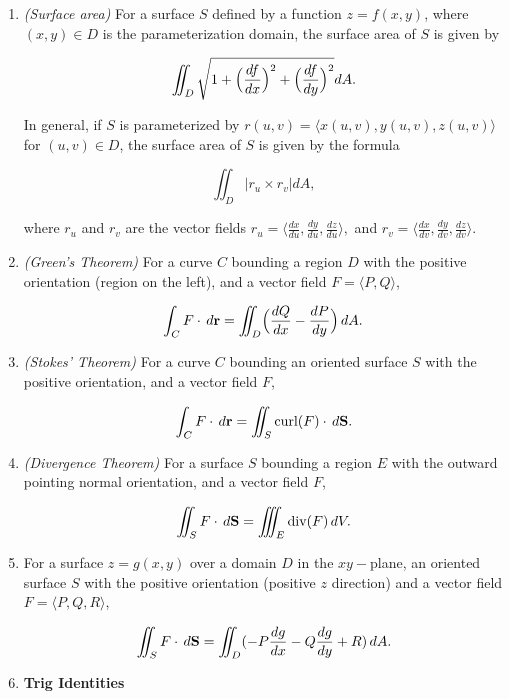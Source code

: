 \documentclass[11 pt]{report}
\begin{document}
\begin{enumerate} 

\item[] \textit{(Surface area)} For a surface $S$ defined by a function $z = f(x,y)$, where $(x,y) \in D$ is the parameterization domain, the surface area of $S$ is given by 

$$\iint_D \sqrt{1+\Bigl(\frac{d f}{dx}\Bigr)^2 + \Bigl(\frac{d f}{dy} \Bigr)^2} dA.$$

In general, if $S$ is parameterized by $r(u,v) = \langle x(u,v), y(u,v), z(u,v) \rangle$ for $(u,v) \in D$, the surface area of $S$ is given by the formula

$$\iint_D |r_u \times r_v| dA,$$

where $r_u$ and $r_v$ are the vector fields $r_u = \langle \frac{dx}{du}, \frac{dy}{du}, \frac{dz}{du} \rangle,$ and $r_v = \langle \frac{dx}{dv}, \frac{dy}{dv}, \frac{dz}{dv} \rangle.$

\item[]\textit{(Green's Theorem)} For a curve $C$ bounding a region $D$ with the positive orientation (region on the left), and a vector field $F = \langle P, Q \rangle$, 

$$\int_C F \cdot \, d\bold{r} = \iint_D \Bigl(\frac{d Q}{dx} - \frac{dP}{dy}\Bigr) \, dA.$$

\item[] \textit{(Stokes' Theorem)} For a curve $C$ bounding an oriented surface $S$ with the positive orientation, and a vector field $F$, 

$$\int_C F \cdot \, d\bold{r} = \iint_S \text{curl}(F) \cdot \, d\bold{S}.$$

\item[] \textit{(Divergence Theorem)} For a surface $S$ bounding a region $E$ with the outward pointing normal orientation, and a vector field $F$, 

$$\iint_S F \cdot \, d\bold{S} = \iiint_E \text{div}(F) \, dV.$$

\item[] For a surface $z = g(x,y)$ over a domain $D$ in the $xy-$plane, an oriented surface $S$ with the positive orientation (positive $z$ direction) and a vector field $F = \langle P, Q, R \rangle$, 

$$\iint_S F \cdot \, d\bold{S} = \iint_D (-P \frac{d g}{dx} - Q \frac{dg}{dy}+R) \, dA.$$



\vspace{10pt} 

\item[] \textbf{Trig Identities} 


\end{enumerate}
\end{document}
